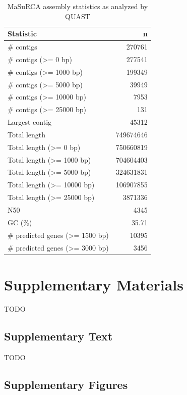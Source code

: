 \documentclass[smallextended]{svjour3}
\newcommand{\beginsupplement}{%
        \setcounter{table}{0}
        \renewcommand{\thetable}{S\arabic{table}}
        \setcounter{figure}{0}
        \renewcommand{\thefigure}{S\arabic{figure}}
        \renewcommand{\thesection}{S\arabic{section}}
        \renewcommand{\thesubsection}{S\arabic{subsection}}
     }
\begin{document}
\clearpage

\begin{longtable}[]{@{}lr@{}}
\caption{MaSuRCA assembly statistics as analyzed by QUAST}\\
\toprule
Statistic & n\tabularnewline
\midrule
\endhead
\# contigs & \num{270761}\tabularnewline
\# contigs (\textgreater{}= 0 bp) & \num{277541}\tabularnewline
\# contigs (\textgreater{}= 1000 bp) & \num{199349}\tabularnewline
\# contigs (\textgreater{}= 5000 bp) & \num{39949}\tabularnewline
\# contigs (\textgreater{}= \num{10000} bp) & \num{7953}\tabularnewline
\# contigs (\textgreater{}= \num{25000} bp) & \num{131}\tabularnewline
Largest contig & \num{45312}\tabularnewline
Total length & \num{749674646}\tabularnewline
Total length (\textgreater{}= 0 bp) & \num{750660819}\tabularnewline
Total length (\textgreater{}= 1000 bp) & \num{704604403}\tabularnewline
Total length (\textgreater{}= 5000 bp) & \num{324631831}\tabularnewline
Total length (\textgreater{}= \num{10000} bp) & \num{106907855}\tabularnewline
Total length (\textgreater{}= \num{25000} bp) & \num{3871336}\tabularnewline
N50 & 4345\tabularnewline
GC (\%) & 35.71\tabularnewline
\# predicted genes (\textgreater{}= 1500 bp) & \num{10395}\tabularnewline
\# predicted genes (\textgreater{}= 3000 bp) & 3456\tabularnewline
\bottomrule
\end{longtable}


\clearpage


\beginsupplement%

\section*{Supplementary Materials}
TODO

\subsection*{Supplementary Text}\label{ss:supp}

TODO


%

\subsection*{Supplementary Figures}\label{ss:sfig}
\end{document}
